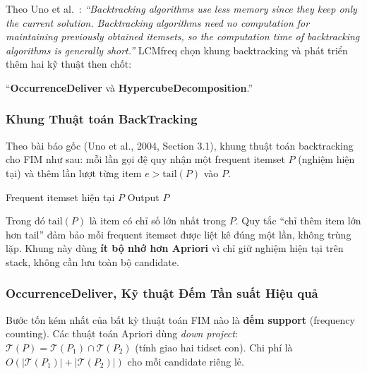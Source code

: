 \documentclass[12pt,a4paper]{article}
\theoremstyle{definition}
\begin{document}
Theo Uno et al.~\cite{uno2004}: \textit{``Backtracking algorithms use less memory since they keep only the current solution. Backtracking algorithms need no computation for maintaining previously obtained itemsets, so the computation time of backtracking algorithms is generally short.''} LCMfreq chọn khung backtracking và phát triển thêm hai kỹ thuật then chốt: \\
\begin{center}
    ``\textbf{OccurrenceDeliver} và \textbf{HypercubeDecomposition}.''
\end{center}

\subsubsection{Khung Thuật toán BackTracking}

Theo bài báo gốc (Uno et al., 2004, Section 3.1), khung thuật toán backtracking cho FIM như sau: mỗi lần gọi đệ quy nhận một frequent itemset $P$ (nghiệm hiện tại) và thêm lần lượt từng item $e > \mathrm{tail}(P)$ vào $P$.

\begin{algorithm}[H]
\caption{BackTracking -- Khung cơ bản (Uno et al., 2004, Section 3.1)}
\label{alg:backtracking}
\begin{algorithmic}[1]
\Require Frequent itemset hiện tại $P$
\State Output $P$
        \State {}
    \EndIf
\EndFor
\end{algorithmic}
\end{algorithm}

Trong đó $\mathrm{tail}(P)$ là item có chỉ số lớn nhất trong $P$. Quy tắc ``chỉ thêm item lớn hơn tail'' đảm bảo mỗi frequent itemset được liệt kê đúng một lần, không trùng lặp. Khung này dùng \textbf{ít bộ nhớ hơn Apriori} vì chỉ giữ nghiệm hiện tại trên stack, không cần lưu toàn bộ candidate.

\subsubsection{OccurrenceDeliver, Kỹ thuật Đếm Tần suất Hiệu quả}

Bước tốn kém nhất của bất kỳ thuật toán FIM nào là \textbf{đếm support} (frequency counting). Các thuật toán Apriori dùng \textit{down project}: $\mathcal{T}(P) = \mathcal{T}(P_1) \cap \mathcal{T}(P_2)$ (tính giao hai tidset con). Chi phí là $O(|\mathcal{T}(P_1)| + |\mathcal{T}(P_2)|)$ cho mỗi candidate riêng lẻ.
\end{document}
